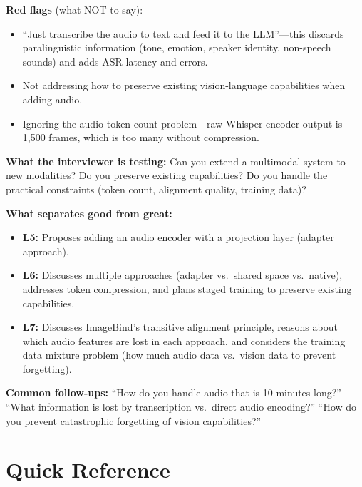 \begin{interviewq}
\textbf{Red flags} (what NOT to say):
\begin{itemize}
    \item ``Just transcribe the audio to text and feed it to the LLM''---this discards paralinguistic information (tone, emotion, speaker identity, non-speech sounds) and adds ASR latency and errors.
    \item Not addressing how to preserve existing vision-language capabilities when adding audio.
    \item Ignoring the audio token count problem---raw Whisper encoder output is 1,500 frames, which is too many without compression.
\end{itemize}

\textbf{What the interviewer is testing:} Can you extend a multimodal system to new modalities? Do you preserve existing capabilities? Do you handle the practical constraints (token count, alignment quality, training data)?

\textbf{What separates good from great:}
\begin{itemize}
    \item \textbf{L5:} Proposes adding an audio encoder with a projection layer (adapter approach).
    \item \textbf{L6:} Discusses multiple approaches (adapter vs.\ shared space vs.\ native), addresses token compression, and plans staged training to preserve existing capabilities.
    \item \textbf{L7:} Discusses ImageBind's transitive alignment principle, reasons about which audio features are lost in each approach, and considers the training data mixture problem (how much audio data vs.\ vision data to prevent forgetting).
\end{itemize}

\textbf{Common follow-ups:} ``How do you handle audio that is 10 minutes long?'' ``What information is lost by transcription vs.\ direct audio encoding?'' ``How do you prevent catastrophic forgetting of vision capabilities?''
\end{interviewq}

\section{Quick Reference}
\label{sec:multimodal_cheatsheet}

